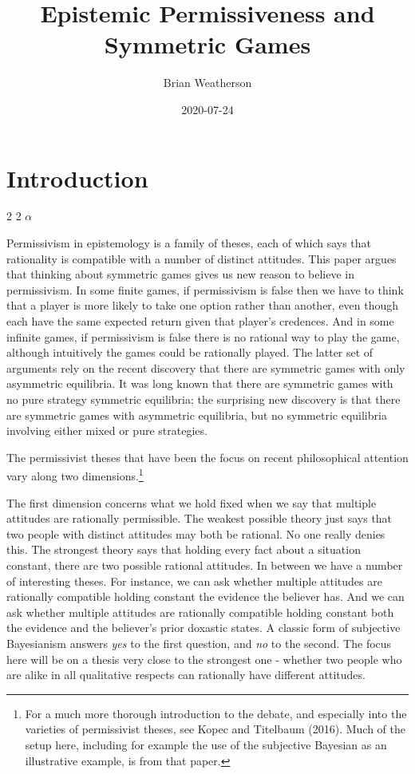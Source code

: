 \documentclass[12pt,]{article}
\title{Epistemic Permissiveness and Symmetric Games}
\author{Brian Weatherson}
\date{2020-07-24}
\let\rmarkdownfootnote\footnote%
\def\footnote{\protect\rmarkdownfootnote}
\begin{document}
\maketitle

\hypertarget{introduction}{%
\section{Introduction}\label{introduction}}

2 2 \(\alpha\)

Permissivism in epistemology is a family of theses, each of which says that rationality is compatible with a number of distinct attitudes. This paper argues that thinking about symmetric games gives us new reason to believe in permissivism. In some finite games, if permissivism is false then we have to think that a player is more likely to take one option rather than another, even though each have the same expected return given that player's credences. And in some infinite games, if permissivism is false there is no rational way to play the game, although intuitively the games could be rationally played. The latter set of arguments rely on the recent discovery that there are symmetric games with only asymmetric equilibria. It was long known that there are symmetric games with no pure strategy symmetric equilibria; the surprising new discovery is that there are symmetric games with asymmetric equilibria, but no symmetric equilibria involving either mixed or pure strategies.

The permissivist theses that have been the focus on recent philosophical attention vary along two dimensions.\footnote{For a much more thorough introduction to the debate, and especially into the varieties of permissivist theses, see Kopec and Titelbaum (2016). Much of the setup here, including for example the use of the subjective Bayesian as an illustrative example, is from that paper.}

The first dimension concerns what we hold fixed when we say that multiple attitudes are rationally permissible. The weakest possible theory just says that two people with distinct attitudes may both be rational. No one really denies this. The strongest theory says that holding every fact about a situation constant, there are two possible rational attitudes. In between we have a number of interesting theses. For instance, we can ask whether multiple attitudes are rationally compatible holding constant the evidence the believer has. And we can ask whether multiple attitudes are rationally compatible holding constant both the evidence and the believer's prior doxastic states. A classic form of subjective Bayesianism answers \emph{yes} to the first question, and \emph{no} to the second. The focus here will be on a thesis very close to the strongest one - whether two people who are alike in all qualitative respects can rationally have different attitudes.
\end{document}
